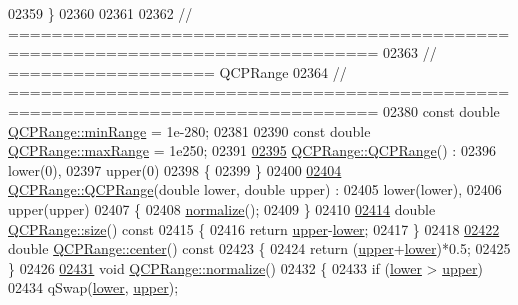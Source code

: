 \begin{DoxyCode}
02359 \}
02360 
02361 
02362 \textcolor{comment}{// ================================================================================}
02363 \textcolor{comment}{// =================== QCPRange}
02364 \textcolor{comment}{// ================================================================================}
02380 \textcolor{comment}{}\textcolor{keyword}{const} \textcolor{keywordtype}{double} \hyperlink{a00049_ab46d3bc95030ee25efda41b89e2b616b}{QCPRange::minRange} = 1e-280;
02381 
02390 \textcolor{keyword}{const} \textcolor{keywordtype}{double} \hyperlink{a00049_a5ca51e7a2dc5dc0d49527ab171fe1f4f}{QCPRange::maxRange} = 1e250;
02391 
\hypertarget{a00115_source_l02395}{}\hyperlink{a00049_aca158d7e69702cee5d77d10a269b01e2}{02395} \hyperlink{a00049_aca158d7e69702cee5d77d10a269b01e2}{QCPRange::QCPRange}() :
02396   lower(0),
02397   upper(0)
02398 \{
02399 \}
02400 
\hypertarget{a00115_source_l02404}{}\hyperlink{a00049_a1d9d84d084c8f368fdedd42e0978d405}{02404} \hyperlink{a00049_aca158d7e69702cee5d77d10a269b01e2}{QCPRange::QCPRange}(\textcolor{keywordtype}{double} lower, \textcolor{keywordtype}{double} upper) :
02405   lower(lower),
02406   upper(upper)
02407 \{
02408   \hyperlink{a00049_af914a7740269b0604d0827c634a878a9}{normalize}();
02409 \}
02410 
\hypertarget{a00115_source_l02414}{}\hyperlink{a00049_afa57c13049b965edb6fd1c00ac56338a}{02414} \textcolor{keywordtype}{double} \hyperlink{a00049_afa57c13049b965edb6fd1c00ac56338a}{QCPRange::size}()\textcolor{keyword}{ const}
02415 \textcolor{keyword}{}\{
02416   \textcolor{keywordflow}{return} \hyperlink{a00049_ae44eb3aafe1d0e2ed34b499b6d2e074f}{upper}-\hyperlink{a00049_aa3aca3edb14f7ca0c85d912647b91745}{lower};
02417 \}
02418 
\hypertarget{a00115_source_l02422}{}\hyperlink{a00049_a3825b53cf17da5de0843c1f3baad07db}{02422} \textcolor{keywordtype}{double} \hyperlink{a00049_a3825b53cf17da5de0843c1f3baad07db}{QCPRange::center}()\textcolor{keyword}{ const}
02423 \textcolor{keyword}{}\{
02424   \textcolor{keywordflow}{return} (\hyperlink{a00049_ae44eb3aafe1d0e2ed34b499b6d2e074f}{upper}+\hyperlink{a00049_aa3aca3edb14f7ca0c85d912647b91745}{lower})*0.5;
02425 \}
02426 
\hypertarget{a00115_source_l02431}{}\hyperlink{a00049_af914a7740269b0604d0827c634a878a9}{02431} \textcolor{keywordtype}{void} \hyperlink{a00049_af914a7740269b0604d0827c634a878a9}{QCPRange::normalize}()
02432 \{
02433   \textcolor{keywordflow}{if} (\hyperlink{a00049_aa3aca3edb14f7ca0c85d912647b91745}{lower} > \hyperlink{a00049_ae44eb3aafe1d0e2ed34b499b6d2e074f}{upper})
02434     qSwap(\hyperlink{a00049_aa3aca3edb14f7ca0c85d912647b91745}{lower}, \hyperlink{a00049_ae44eb3aafe1d0e2ed34b499b6d2e074f}{upper});

\end{DoxyCode}
